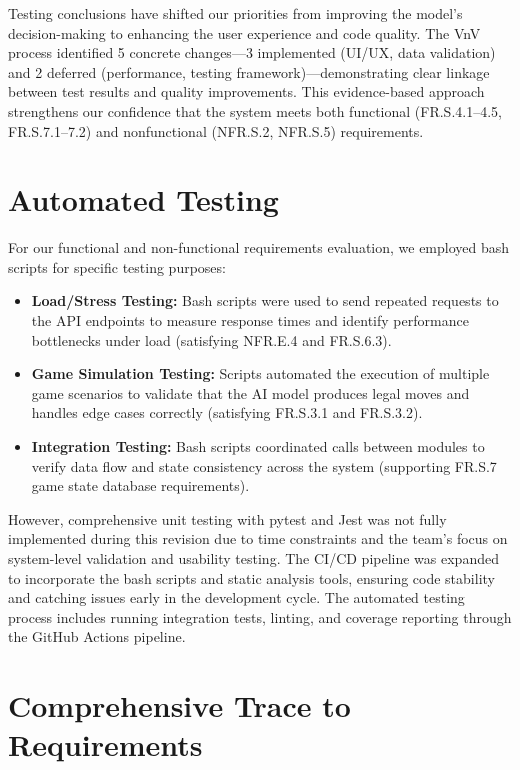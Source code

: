 \documentclass[12pt, titlepage]{article}
\begin{document}
Testing conclusions have shifted our priorities from improving the model's decision-making to enhancing the user experience and code quality. The VnV process identified 5 concrete changes—3 implemented (UI/UX, data validation) and 2 deferred (performance, testing framework)—demonstrating clear linkage between test results and quality improvements. This evidence-based approach strengthens our confidence that the system meets both functional (FR.S.4.1--4.5, FR.S.7.1--7.2) and nonfunctional (NFR.S.2, NFR.S.5) requirements.

\section{Automated Testing}

For our functional and non-functional requirements evaluation, we employed bash scripts for specific testing purposes:
\begin{itemize}
    \item \textbf{Load/Stress Testing:} Bash scripts were used to send repeated requests to the API endpoints to measure response times and identify performance bottlenecks under load (satisfying NFR.E.4 and FR.S.6.3).
    \item \textbf{Game Simulation Testing:} Scripts automated the execution of multiple game scenarios to validate that the AI model produces legal moves and handles edge cases correctly (satisfying FR.S.3.1 and FR.S.3.2).
    \item \textbf{Integration Testing:} Bash scripts coordinated calls between modules to verify data flow and state consistency across the system (supporting FR.S.7 game state database requirements).
\end{itemize}

However, comprehensive unit testing with pytest and Jest was not fully implemented during this revision due to time constraints and the team's focus on system-level validation and usability testing.
The CI/CD pipeline was expanded to incorporate the bash scripts and static analysis tools, ensuring code stability and catching issues early in the development cycle.
The automated testing process includes running integration tests, linting, and coverage reporting through the GitHub Actions pipeline.

\section{Comprehensive Trace to Requirements}
\end{document}
